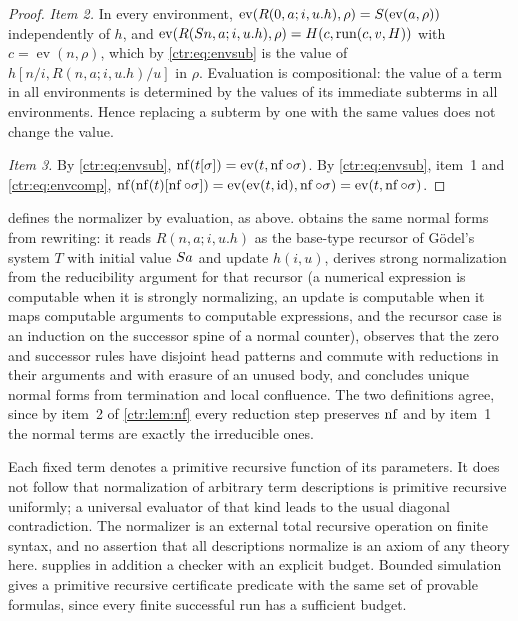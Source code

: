 \begin{proof}
\emph{Item 2.} In every environment,
$\operatorname{ev}(R(0,a;i,u.h),\rho)=S(\operatorname{ev}(a,\rho))$ independently of $h$,
and $\operatorname{ev}(R(S n,a;i,u.h),\rho)=H(c,\operatorname{run}(c,v,H))$ with
$c=\operatorname{ev}(n,\rho)$, which by \eqref{ctr:eq:envsub} is the value of
$h[n/i,R(n,a;i,u.h)/u]$ in $\rho$. Evaluation is compositional: the value of a term in all
environments is determined by the values of its immediate subterms in all environments.
Hence replacing a subterm by one with the same values does not change the value.

\emph{Item 3.} By \eqref{ctr:eq:envsub}, $\operatorname{nf}(t[\sigma])=\operatorname{ev}(t,\operatorname{nf}\circ\sigma)$.
By \eqref{ctr:eq:envsub}, item~1 and \eqref{ctr:eq:envcomp},
$\operatorname{nf}(\operatorname{nf}(t)[\operatorname{nf}\circ\sigma])=\operatorname{ev}(\operatorname{ev}(t,\mathrm{id}),\operatorname{nf}\circ\sigma)
=\operatorname{ev}(t,\operatorname{nf}\circ\sigma)$.
\end{proof}

\begin{remark}\label{ctr:rem:nfvariants}
 defines the normalizer by evaluation, as above.
 obtains the same normal forms from rewriting: it reads
$R(n,a;i,u.h)$ as the base-type recursor of G\"odel's system $T$ with initial value
$S a$ and update $h(i,u)$, derives strong normalization from the reducibility argument
for that recursor (a numerical expression is computable when it is strongly normalizing, an
update is computable when it maps computable arguments to computable expressions, and the
recursor case is an induction on the successor spine of a normal counter), observes that the
zero and successor rules have disjoint head patterns and commute with reductions in their
arguments and with erasure of an unused body, and concludes unique normal forms from
termination and local confluence. The two definitions agree, since by item~2 of
\cref{ctr:lem:nf} every reduction step preserves $\operatorname{nf}$ and by item~1 the normal terms are
exactly the irreducible ones.
\end{remark}

\begin{remark}\label{ctr:rem:fuel}
Each fixed term denotes a primitive recursive function of its parameters. It does not follow
that normalization of arbitrary term descriptions is primitive recursive uniformly; a
universal evaluator of that kind leads to the usual diagonal contradiction. The normalizer is
an external total recursive operation on finite syntax, and no assertion that all
descriptions normalize is an axiom of any theory here.  supplies in
addition a checker with an explicit budget. Bounded simulation gives a primitive recursive
certificate predicate with the same set of provable formulas, since every finite successful
run has a sufficient budget.
\end{remark}

